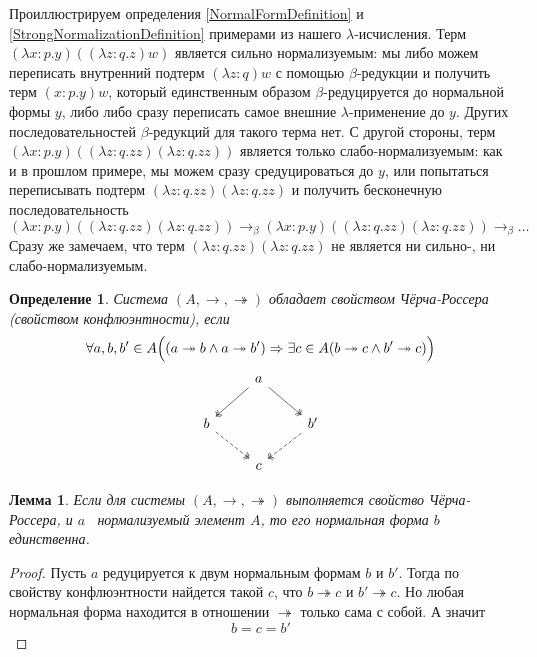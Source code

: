 \documentclass{article}[14pt]
\newtheorem{lemma}{Лемма}
\newtheorem{definition}{Определение}
\newcommand{\dash}{\textemdash\ }
\begin{document}
Проиллюстрируем определения \ref{NormalFormDefinition} и \ref{StrongNormalizationDefinition} примерами из
нашего $\lambda$-исчисления. Терм $(\lambda x : p . y)((\lambda z : q . z) w)$ является сильно нормализуемым:
мы либо можем переписать внутренний подтерм $(\lambda z : q) w$ с помощью $\beta$-редукции и получить
терм $(x : p . y) w$, который единственным образом $\beta$-редуцируется до нормальной формы $y$, либо
либо сразу переписать самое внешние $\lambda$-применение до $y$. Других последовательностей $\beta$-редукций
для такого терма нет. С другой стороны, терм $(\lambda x : p . y)((\lambda z : q . zz)(\lambda z : q . zz))$
является только слабо-нормализуемым: как и в прошлом примере, мы можем сразу средуцироваться до $y$,
или попытаться переписывать подтерм $(\lambda z : q . zz)(\lambda z : q . zz)$ и получить бесконечную последовательность
$$(\lambda x : p . y)((\lambda z : q . zz)(\lambda z : q . zz)) \rightarrow_\beta (\lambda x : p . y)((\lambda z : q . zz)(\lambda z : q . zz)) \rightarrow_\beta \dots$$
Сразу же замечаем, что терм $(\lambda z : q . zz)(\lambda z : q . zz)$ не является ни сильно-,
ни слабо-нормализуемым.

\begin{definition}
    \label{ChurchRosserDefinition}
    Система $(A, \rightarrow, \twoheadrightarrow)$ обладает свойством Чёрча-Россера (свойством конфлюэнтности),
    если 
    $$\forall a, b, b' \in A \Bigl((a \twoheadrightarrow b \land a \twoheadrightarrow b') \Rightarrow \exists c \in A (b \twoheadrightarrow c \land b' \twoheadrightarrow c) \Bigr)$$
    $$
    \begin{tikzcd}
        & \arrow[ld, two heads] a \arrow[rd, two heads] & \\
        b \arrow[rd, two heads, dashed] & & \arrow[ld, two heads, dashed] b' \\
        & c &
    \end{tikzcd}
    $$
\end{definition}

\begin{lemma}
    \label{UniqueNormalFormLemma}
    Если для системы $(A, \rightarrow, \twoheadrightarrow)$ выполняется свойство Чёрча-Россера, и
    $a$ \dash нормализуемый элемент $A$, то его нормальная форма $b$ единственна.
\end{lemma}
\begin{proof}
    Пусть $a$ редуцируется к двум нормальным формам $b$ и $b'$. Тогда по свойству
    конфлюэнтности найдется такой $c$, что $b \twoheadrightarrow c$ и $b' \twoheadrightarrow c$. Но
    любая нормальная форма находится в отношении $\twoheadrightarrow$ только сама с собой.
    А значит
    $$b = c = b'$$
\end{proof}
\end{document}
